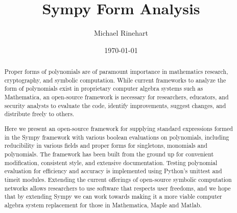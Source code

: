 \documentclass{article}
\title{Sympy Form Analysis}
\author{Michael Rinehart}
\date{\today}
\begin{document}
\maketitle

\begin{abstract}
Proper forms of polynomials are of paramount importance in mathematics research, cryptography, and symbolic computation. 
While current frameworks to analyze the form of polynomials exist in proprietary computer algebra systems such as Mathematica, an open-source framework is necessary for researchers, educators, and security analysts to evaluate the code, identify improvements, suggest changes, and distribute freely to others.

Here we present an open-source framework for supplying standard expressions formed in the Sympy framework with various boolean evaluations on polynomials, including reducibility in various fields and proper forms for singletons, monomials and polynomials. 
The framework has been built from the ground up for convenient modification, consistent style, and extensive documentation. 
Testing polynomial evaluation for efficiency and accuracy is implemented using Python’s unittest and timeit modules. 
Extending the current offerings of open-source symbolic computation networks allows researchers to use software that respects user freedoms, and we hope that by extending Sympy we can work towards making it a more viable computer algebra system replacement for those in Mathematica, Maple and Matlab.
\end{abstract}
\end{document}
